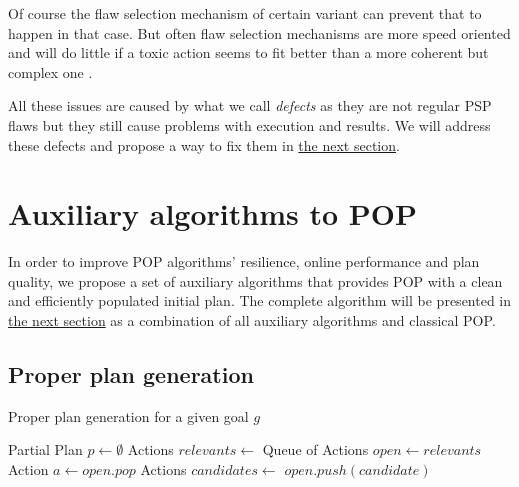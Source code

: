 \documentclass[]{article}
\begin{document}
Of course the flaw selection mechanism of certain variant can prevent
that to happen in that case. But often flaw selection mechanisms are
more speed oriented and will do little if a toxic action seems to fit
better than a more coherent but complex one .

All these issues are caused by what we call \emph{defects} as they are
not regular PSP flaws but they still cause problems with execution and
results. We will address these defects and propose a way to fix them in
\protect\hyperlink{defects}{the next section}.

\section{Auxiliary algorithms to POP}\label{auxiliary-algorithms-to-pop}

In order to improve POP algorithms' resilience, online performance and
plan quality, we propose a set of auxiliary algorithms that provides POP
with a clean and efficiently populated initial plan. The complete
algorithm will be presented in \protect\hyperlink{soda}{the next
section} as a combination of all auxiliary algorithms and classical POP.

\subsection{Proper plan generation}\label{proper-plan-generation}

\begin{algorithm}\caption{Proper plan generation for a given goal $g$}\label{properplan}\begin{algorithmic}[1]

 \State Partial Plan
\(p \gets \emptyset\) \State Actions \(relevants \gets\)
\State Queue of Actions \(open \gets relevants\)
 \State Action \(a\gets open.pop\)
\State Actions \(candidates \gets\) 
 
\State \(open.push(candidate)\) \EndIf
        \EndFor
    \EndWhile
\EndFunction

\end{algorithmic}\end{algorithm}
\end{document}
